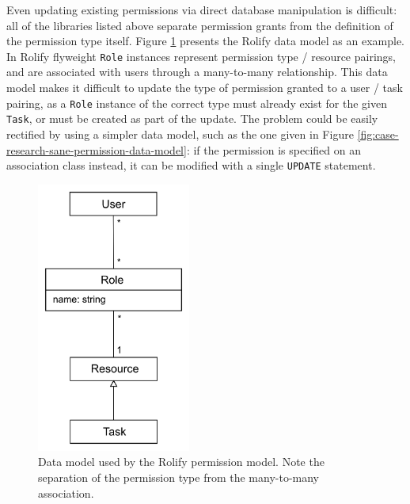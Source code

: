 \documentclass[document.tex]{subfiles}
\begin{document}
Even updating existing permissions via direct database manipulation is difficult: all of the libraries listed above separate permission grants from the definition of the permission type itself.
Figure \ref{fig:case-research-rolify-data-model} presents the Rolify data model as an example.
In Rolify flyweight \verb!Role! instances represent permission type / resource pairings, and are associated with users through a many-to-many relationship.
This data model makes it difficult to update the type of permission granted to a user / task pairing, as a \verb!Role! instance of the correct type must already exist for the given \verb!Task!, or must be created as part of the update.
The problem could be easily rectified by using a simpler data model, such as the one given in Figure \ref{fig:case-research-sane-permission-data-model}: if the permission is specified on an association class instead, it can be modified with a single \verb!UPDATE! statement.

\begin{figure}[!ht]
\centering \includegraphics[height=3.5in]{./img/case-study-research-railgun/rolify-data-model}
\caption{Data model used by the Rolify permission model. Note the separation of the permission type from the many-to-many association.}
\label{fig:case-research-rolify-data-model}
\end{figure}
\end{document}
